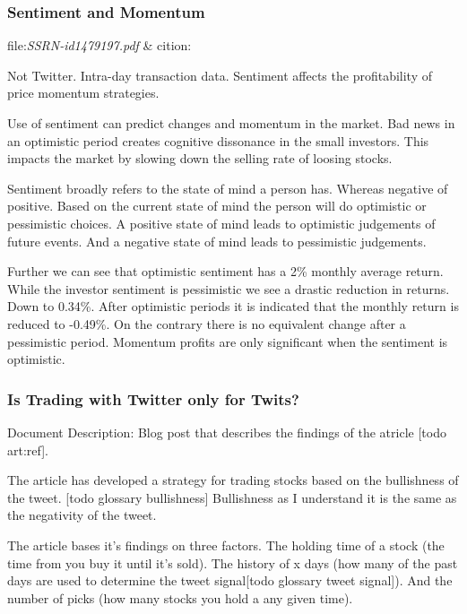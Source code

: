 \subsubsection{Sentiment and Momentum}\label{sentiment_and_momentum}
file:\textit{SSRN-id1479197.pdf} & cition:\cite[]{doukas10:sentiment_and_momentum}

Not Twitter. Intra-day transaction data. 
Sentiment affects the profitability of price momentum strategies.

Use of sentiment can predict changes and momentum in the market.
Bad news in an optimistic period creates cognitive dissonance in the small
investors. This impacts the market by slowing down the selling rate of loosing
stocks. \cite[p29]{doukas10:sentiment_and_momentum} 

Sentiment broadly refers to the state of mind a person has. Whereas negative of
positive. Based on the current state of mind the person will do optimistic or
pessimistic choices. A positive state of mind leads to optimistic judgements of
future events. And a negative state of mind leads to pessimistic judgements. 
\cite[p4]{doukas10:sentiment_and_momentum} 

Further we can see that optimistic sentiment has a 2\% monthly average return. 
While the investor sentiment is pessimistic we see a drastic reduction in
returns. Down to 0.34\%.\cite[p5]{doukas10:sentiment_and_momentum} 
After optimistic periods it is indicated that the monthly return is reduced to
-0.49\%. On the contrary there is no equivalent change after a pessimistic
period. \cite[p6-7]{doukas10:sentiment_and_momentum} 
Momentum profits are only significant when the sentiment is optimistic.
\cite[p29]{doukas10:sentiment_and_momentum}


\subsubsection{Is Trading with Twitter only for Twits?}\label{art:ITTT}
Document Description: Blog post that describes the findings of the atricle [todo
art:ref]. 

The article has developed a strategy for trading stocks based on the
bullishness of the tweet. [todo glossary bullishness] Bullishness as I
understand it
is the same as the negativity of the tweet. 

The article bases it's findings on three factors. The holding time of a stock
(the time from you buy it until it's sold). The history of x days (how many of
the past days are used to determine the tweet signal[todo glossary tweet
signal]). And the number of picks (how many stocks you hold a any given
time). 

